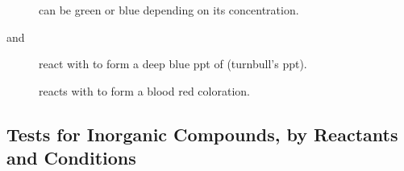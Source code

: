 \documentclass[../main]{subfiles}
\begin{document}
		\begin{description}
			\item[] can be green or blue depending on its concentration.
			\item[ and ] react with  to form a deep blue ppt of  (turnbull's ppt).
			\item[] reacts with  to form a blood red coloration.
		\end{description}

	\subsection{Tests for Inorganic Compounds, by Reactants and Conditions}
\end{document}
